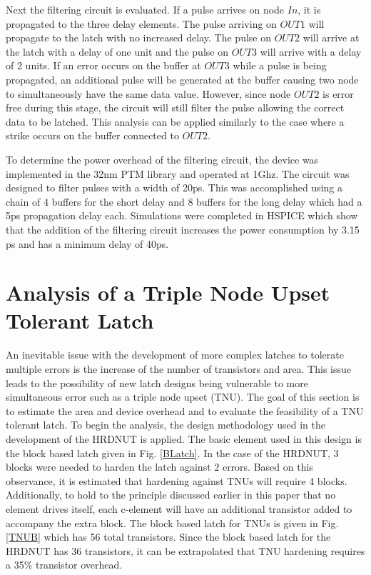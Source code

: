 Next the filtering circuit is evaluated. If a pulse arrives on node $In$, it is propagated to the three delay elements. The pulse arriving on $OUT1$ will propagate to the latch with no increased delay. The pulse on $OUT2$ will arrive at the latch with a delay of one unit and the pulse on $OUT3$ will arrive with a delay of 2 units. If an error occurs on the buffer at $OUT3$ while a pulse is being propagated, an additional pulse will be generated at the buffer causing two node to simultaneously have the same data value. However, since node $OUT2$ is error free during this stage, the circuit will still filter the pulse allowing the correct data to be latched. This analysis can be applied similarly to the case where a strike occurs on the buffer connected to $OUT2$.

To determine the power overhead of the filtering circuit, the device was implemented in the 32nm PTM library and operated at 1Ghz. The circuit was designed to filter pulses with a width of 20ps. This was accomplished using a chain of 4 buffers for the short delay and 8 buffers for the long delay which had a 5ps propagation delay each. Simulations were completed in HSPICE which show that the addition of the filtering circuit increases the power consumption by 3.15 ps and has a minimum delay of 40ps.

\section{Analysis of a Triple Node Upset Tolerant Latch}
An inevitable issue with the development of more complex latches to tolerate multiple errors is the increase of the number of transistors and area. This issue leads to the possibility of new latch designs being vulnerable to more simultaneous error such as a triple node upset (TNU). The goal of this section is to estimate the area and device overhead and to evaluate the feasibility of a TNU tolerant latch. To begin the analysis, the design methodology used in the development of the HRDNUT is applied. The basic element used in this design is the block based latch given in Fig. \ref{BLatch}. In the case of the HRDNUT, 3 blocks were needed to harden the latch against 2 errors. Based on this observance, it is estimated that hardening against TNUs will require 4 blocks. Additionally, to hold to the principle discussed earlier in this paper that no element drives itself, each c-element will have an additional transistor added to accompany the extra block. The block based latch for TNUs is given in Fig. \ref{TNUB} which has 56 total transistors. Since the block based latch for the HRDNUT has 36 transistors, it can be extrapolated that TNU hardening requires a 35\% transistor overhead.

